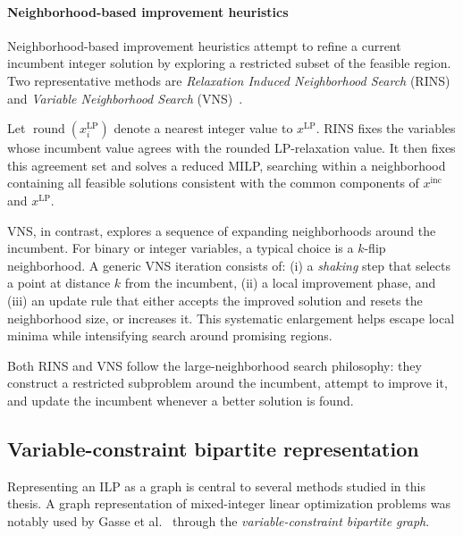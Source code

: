 \paragraph{Neighborhood-based improvement heuristics}
Neighborhood-based improvement heuristics attempt to refine a current incumbent integer solution by exploring a restricted subset of the feasible region. Two representative methods are \emph{Relaxation Induced Neighborhood Search} (RINS)~\cite{danna_exploring_2005} and \emph{Variable Neighborhood Search} (VNS)~\cite{mladenovic_variable_1997,hansen_variable_2008}.

Let $\operatorname{round}(x^{\mathrm{LP}}_i)$ denote a nearest integer value to $x^{\mathrm{LP}}$. RINS fixes the variables whose incumbent value agrees with the rounded LP-relaxation value. It then fixes this agreement set and solves a reduced MILP, searching within a neighborhood containing all feasible solutions consistent with the common components of $x^{\mathrm{inc}}$ and $x^{\mathrm{LP}}$.

VNS, in contrast, explores a sequence of expanding neighborhoods around the incumbent. For binary or integer variables, a typical choice is a $k$-flip neighborhood. A generic VNS iteration consists of: (i) a \emph{shaking} step that selects a point at distance $k$ from the incumbent, (ii) a local improvement phase, and (iii) an update rule that either accepts the improved solution and resets the neighborhood size, or increases it. This systematic enlargement helps escape local minima while intensifying search around promising regions.

Both RINS and VNS follow the large-neighborhood search philosophy: they construct a restricted subproblem around the incumbent, attempt to improve it, and update the incumbent whenever a better solution is found.

\subsection{Variable-constraint bipartite representation}
\label{sec:vcg_definition}

Representing an ILP as a graph is central to several methods studied in this thesis. A graph representation of mixed-integer linear optimization problems was notably used by Gasse et al.~\cite{gasse_exact_2019} through the \emph{variable-constraint bipartite graph}.

